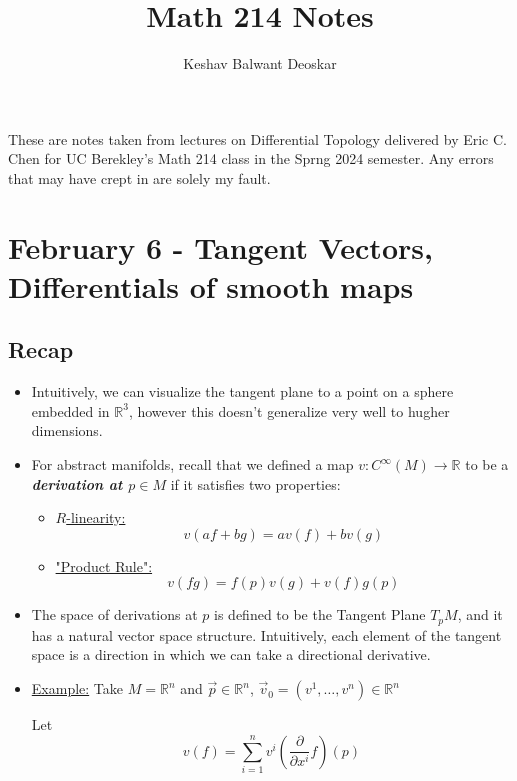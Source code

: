\documentclass{article}
\title{Math 214 Notes}
\author{Keshav Balwant Deoskar}
\newcommand{\R}{\mathbb{R}}
\begin{document}
\maketitle

These are notes taken from lectures on Differential Topology delivered by Eric C. Chen for UC Berekley's Math 214 class in the Sprng 2024 semester. Any errors that may have crept in are solely my fault.

\tableofcontents

\pagebreak

\section{February 6 - Tangent Vectors, Differentials of smooth maps}

\vskip 0.5cm
\subsection*{Recap}

\vskip 0.5cm
\begin{itemize}
  \item Intuitively, we can visualize the tangent plane to a point on a sphere embedded in $\R^3$, however this doesn't generalize very well to hugher dimensions.
  \item For abstract manifolds, recall that we defined a map $v : C^{\infty}(M) \rightarrow \R$ to be a \emph{\textbf{derivation at $p \in M$}} if it satisfies two properties:
  \begin{itemize}
    \item \underline{$R$-linearity:}
    \[ v(af + bg) = av(f) + bv(g) \]

    \item \underline{"Product Rule":} 
    \[ v(fg) = f(p)v(g) + v(f)g(p) \]
  \end{itemize} 
  \item The space of derivations at $p$ is defined to be the Tangent Plane $T_pM$, and it has a natural vector space structure. Intuitively, each element of the tangent space is a direction in which we can take a directional derivative.
  
  \item \underline{Example:} Take $M = \R^n$ and $\vec{p} \in \R^n$, $\vec{v}_0 = (v^1, \dots, v^n) \in \R^n$
  
  \vskip 0.5cm
  Let 
  \[ v(f) = \sum_{i = 1}^n v^i \left(\frac{\partial }{\partial x^i} f\right)(p) \]
\end{itemize}
\end{document}
